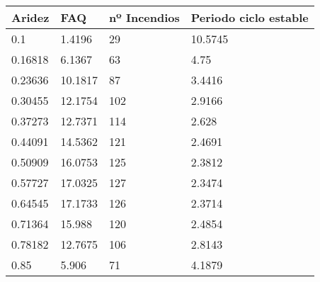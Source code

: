 \begin{tabular}{llll}
Aridez & FAQ & nº Incendios & Periodo ciclo estable \\ 
\hline 
0.1 & 1.4196 & 29 & 10.5745 \\ 
0.16818 & 6.1367 & 63 & 4.75 \\ 
0.23636 & 10.1817 & 87 & 3.4416 \\ 
0.30455 & 12.1754 & 102 & 2.9166 \\ 
0.37273 & 12.7371 & 114 & 2.628 \\ 
0.44091 & 14.5362 & 121 & 2.4691 \\ 
0.50909 & 16.0753 & 125 & 2.3812 \\ 
0.57727 & 17.0325 & 127 & 2.3474 \\ 
0.64545 & 17.1733 & 126 & 2.3714 \\ 
0.71364 & 15.988 & 120 & 2.4854 \\ 
0.78182 & 12.7675 & 106 & 2.8143 \\ 
0.85 & 5.906 & 71 & 4.1879 \\ 
\hline 
\end{tabular}